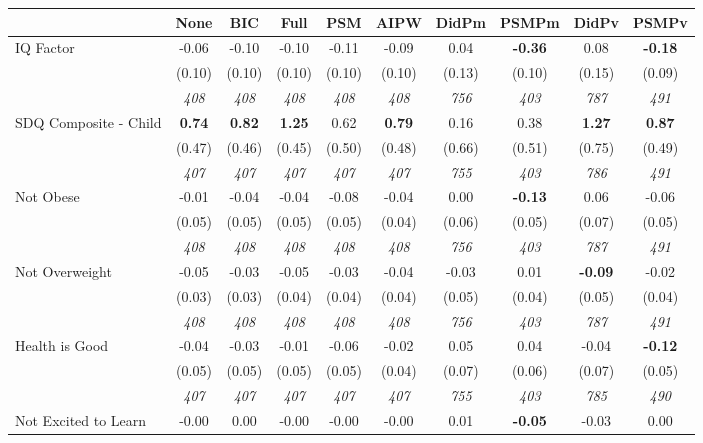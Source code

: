 \begin{tabular}{l c c c c c c c c c}
\toprule
 & None & BIC & Full & PSM & AIPW & DidPm & PSMPm & DidPv & PSMPv \\
\midrule
IQ Factor & -0.06 & -0.10 & -0.10 & -0.11 & -0.09 & 0.04 & \textbf{-0.36} & 0.08 & \textbf{-0.18} \\
& (0.10) & (0.10) & (0.10) & (0.10) & (0.10) & (0.13) & (0.10) & (0.15) & (0.09) \\
& \textit{ 408 } & \textit{ 408 } & \textit{ 408 } & \textit{ 408 } & \textit{ 408 } & \textit{ 756 } & \textit{ 403 } & \textit{ 787 } & \textit{ 491 } \\
SDQ Composite - Child & \textbf{ 0.74 } & \textbf{ 0.82 } & \textbf{ 1.25 } & 0.62 & \textbf{0.79} & 0.16 & 0.38 & \textbf{ 1.27 } & \textbf{0.87} \\
& (0.47) & (0.46) & (0.45) & (0.50) & (0.48) & (0.66) & (0.51) & (0.75) & (0.49) \\
& \textit{ 407 } & \textit{ 407 } & \textit{ 407 } & \textit{ 407 } & \textit{ 407 } & \textit{ 755 } & \textit{ 403 } & \textit{ 786 } & \textit{ 491 } \\
Not Obese & -0.01 & -0.04 & -0.04 & -0.08 & -0.04 & 0.00 & \textbf{-0.13} & 0.06 & -0.06 \\
& (0.05) & (0.05) & (0.05) & (0.05) & (0.04) & (0.06) & (0.05) & (0.07) & (0.05) \\
& \textit{ 408 } & \textit{ 408 } & \textit{ 408 } & \textit{ 408 } & \textit{ 408 } & \textit{ 756 } & \textit{ 403 } & \textit{ 787 } & \textit{ 491 } \\
Not Overweight & -0.05 & -0.03 & -0.05 & -0.03 & -0.04 & -0.03 & 0.01 & \textbf{ -0.09 } & -0.02 \\
& (0.03) & (0.03) & (0.04) & (0.04) & (0.04) & (0.05) & (0.04) & (0.05) & (0.04) \\
& \textit{ 408 } & \textit{ 408 } & \textit{ 408 } & \textit{ 408 } & \textit{ 408 } & \textit{ 756 } & \textit{ 403 } & \textit{ 787 } & \textit{ 491 } \\
Health is Good & -0.04 & -0.03 & -0.01 & -0.06 & -0.02 & 0.05 & 0.04 & -0.04 & \textbf{-0.12} \\
& (0.05) & (0.05) & (0.05) & (0.05) & (0.04) & (0.07) & (0.06) & (0.07) & (0.05) \\
& \textit{ 407 } & \textit{ 407 } & \textit{ 407 } & \textit{ 407 } & \textit{ 407 } & \textit{ 755 } & \textit{ 403 } & \textit{ 785 } & \textit{ 490 } \\
Not Excited to Learn & -0.00 & 0.00 & -0.00 & -0.00 & -0.00 & 0.01 & \textbf{-0.05} & -0.03 & 0.00 \\

\end{tabular}
